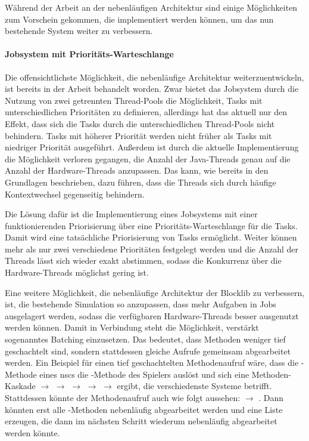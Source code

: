 Während der Arbeit an der nebenläufigen Architektur sind einige Möglichkeiten zum Vorschein gekommen, die implementiert werden können, um das nun bestehende System weiter zu verbessern.
\paragraph{Jobsystem mit Prioritäts-Warteschlange}
Die offensichtlichste Möglichkeit, die nebenläufige Architektur weiterzuentwickeln, ist bereits in der Arbeit behandelt worden. Zwar bietet das Jobsystem durch die Nutzung von zwei getrennten Thread-Pools die Möglichkeit, Tasks mit unterschiedlichen Prioritäten zu definieren, allerdings hat das aktuell nur den Effekt, dass sich die Tasks durch die unterschiedlichen Thread-Pools nicht behindern. Tasks mit höherer Priorität werden nicht früher als Tasks mit niedriger Priorität ausgeführt. Außerdem ist durch die aktuelle Implementierung die Möglichkeit verloren gegangen, die Anzahl der Java-Threads genau auf die Anzahl der Hardware-Threads anzupassen. Das kann, wie bereits in den Grundlagen beschrieben, dazu führen, dass die Threads sich durch häufige Kontextwechsel gegenseitig behindern.

Die Lösung dafür ist die Implementierung eines Jobsystems mit einer funktionierenden Priorisierung über eine Prioritäts-Warteschlange für die Tasks. Damit wird eine tatsächliche Priorisierung von Tasks ermöglicht. Weiter können mehr als nur zwei verschiedene Prioritäten festgelegt werden und die Anzahl der Threads lässt sich wieder exakt abstimmen, sodass die Konkurrenz über die Hardware-Threads möglichst gering ist.

Eine weitere Möglichkeit, die nebenläufige Architektur der Blocklib zu verbessern, ist, die bestehende Simulation so anzupassen, dass mehr Aufgaben in Jobs ausgelagert werden, sodass die verfügbaren Hardware-Threads besser ausgenutzt werden können. Damit in Verbindung steht die Möglichkeit, verstärkt sogenanntes Batching einzusetzen. Das bedeutet, dass Methoden weniger tief geschachtelt sind, sondern stattdessen gleiche Aufrufe gemeinsam abgearbeitet werden.
Ein Beispiel für einen tief geschachtelten Methodenaufruf wäre, dass die -Methode eines \acsp{nsc} die -Methode des Spielers auslöst und sich eine Methoden-Kaskade  $\to$  $\to$  $\to$  $\to$  $\to$  ergibt, die verschiedenste Systeme betrifft. Stattdessen könnte der Methodenaufruf auch wie folgt aussehen:  $\to$ . Dann könnten erst alle 
-Methoden nebenläufig abgearbeitet werden und eine Liste erzeugen, die dann im nächsten Schritt wiederum nebenläufig abgearbeitet werden könnte. 

